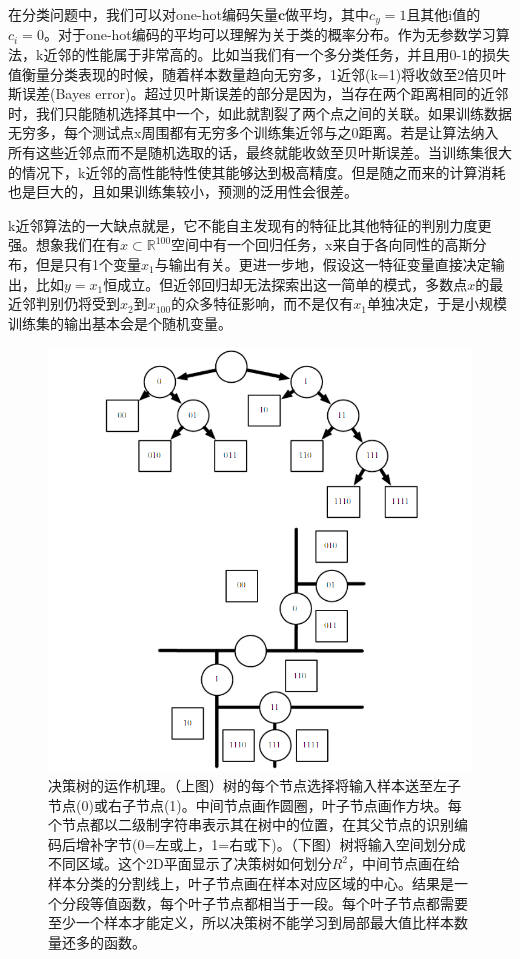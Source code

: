 在分类问题中，我们可以对one-hot编码矢量$\textbf{c}$做平均，其中$c_{y}=1$且其他i值的$c_{i}=0$。对于one-hot编码的平均可以理解为关于类的概率分布。作为无参数学习算法，k近邻的性能属于非常高的。比如当我们有一个多分类任务，并且用0-1的损失值衡量分类表现的时候，随着样本数量趋向无穷多，1近邻(k=1)将收敛至2倍贝叶斯误差(Bayes error)。超过贝叶斯误差的部分是因为，当存在两个距离相同的近邻时，我们只能随机选择其中一个，如此就割裂了两个点之间的关联。如果训练数据无穷多，每个测试点x周围都有无穷多个训练集近邻与之0距离。若是让算法纳入所有这些近邻点而不是随机选取的话，最终就能收敛至贝叶斯误差。当训练集很大的情况下，k近邻的高性能特性使其能够达到极高精度。但是随之而来的计算消耗也是巨大的，且如果训练集较小，预测的泛用性会很差。

k近邻算法的一大缺点就是，它不能自主发现有的特征比其他特征的判别力度更强。想象我们在有$x\subset\mathbb{R}^{100}$空间中有一个回归任务，x来自于各向同性的高斯分布，但是只有1个变量$x_{1}$与输出有关。更进一步地，假设这一特征变量直接决定输出，比如$y=x_{1}$恒成立。但近邻回归却无法探索出这一简单的模式，多数点$x$的最近邻判别仍将受到$x_{2}$到$x_{100}$的众多特征影响，而不是仅有$x_{1}$单独决定，于是小规模训练集的输出基本会是个随机变量。

\begin{figure}[htbp]
   \centering
   \includegraphics[width=6in]{fig/chap5/5_7.png} 
   \caption{决策树的运作机理。（上图）树的每个节点选择将输入样本送至左子节点(0)或右子节点(1)。中间节点画作圆圈，叶子节点画作方块。每个节点都以二级制字符串表示其在树中的位置，在其父节点的识别编码后增补字节(0=左或上，1=右或下)。（下图）树将输入空间划分成不同区域。这个2D平面显示了决策树如何划分$R^{2}$，中间节点画在给样本分类的分割线上，叶子节点画在样本对应区域的中心。结果是一个分段等值函数，每个叶子节点都相当于一段。每个叶子节点都需要至少一个样本才能定义，所以决策树不能学习到局部最大值比样本数量还多的函数。}
   \label{fig:5_7}
\end{figure}

